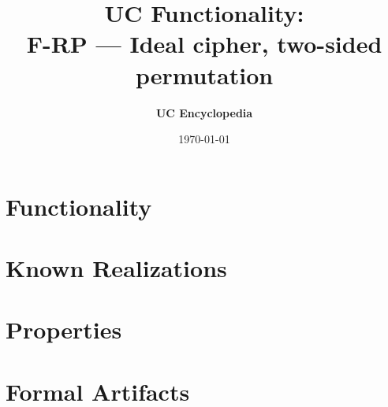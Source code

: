 \documentclass[11pt,a4paper]{article}
\title{\textbf{\Large UC Functionality:}\\[0.2em] \Large F-RP --- Ideal cipher, two-sided permutation}
\author{\textbf{UC Encyclopedia}}
\date{\today}
\newtheorem{functionality}{Functionality}
\begin{document}
\maketitle

\begin{abstract}
\end{abstract}

\section{Functionality}

%

\section{Known Realizations}


\section{Properties}


\section{Formal Artifacts}

\end{document}
